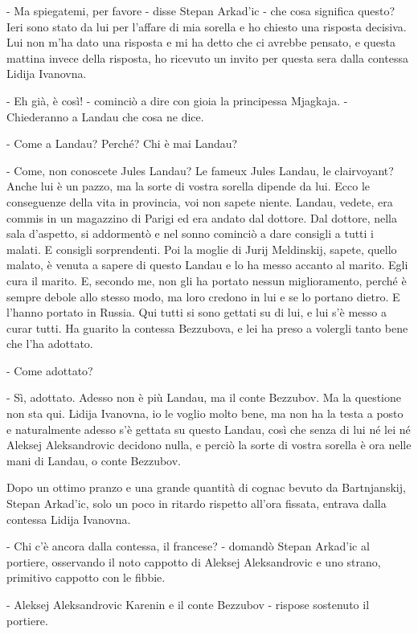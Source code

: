 - Ma spiegatemi, per favore - disse Stepan Arkad'ic - che cosa significa questo? Ieri sono stato da lui per l'affare di mia sorella e ho chiesto una risposta decisiva. Lui non m'ha dato una risposta e mi ha detto che ci avrebbe pensato, e questa mattina invece della risposta, ho ricevuto un invito per questa sera dalla contessa Lidija Ivanovna. 

- Eh già, è così! - cominciò a dire con gioia la principessa Mjagkaja. - Chiederanno a Landau che cosa ne dice. 

- Come a Landau? Perché? Chi è mai Landau? 

- Come, non conoscete Jules Landau? Le fameux Jules Landau, le clairvoyant? Anche lui è un pazzo, ma la sorte di vostra sorella dipende da lui. Ecco le conseguenze della vita in provincia, voi non sapete niente. Landau, vedete, era commis in un magazzino di Parigi ed era andato dal dottore. Dal dottore, nella sala d'aspetto, si addormentò e nel sonno cominciò a dare consigli a tutti i malati. E consigli sorprendenti. Poi la moglie di Jurij Meldinskij, sapete, quello malato, è venuta a sapere di questo Landau e lo ha messo accanto al marito. Egli cura il marito. E, secondo me, non gli ha portato nessun miglioramento, perché è sempre debole allo stesso modo, ma loro credono in lui e se lo portano dietro. E l'hanno portato in Russia. Qui tutti si sono gettati su di lui, e lui s'è messo a curar tutti. Ha guarito la contessa Bezzubova, e lei ha preso a volergli tanto bene che l'ha adottato. 

- Come adottato? 

- Sì, adottato. Adesso non è più Landau, ma il conte Bezzubov. Ma la questione non sta qui. Lidija Ivanovna, io le voglio molto bene, ma non ha la testa a posto e naturalmente adesso s'è gettata su questo Landau, così che senza di lui né lei né Aleksej Aleksandrovic decidono nulla, e perciò la sorte di vostra sorella è ora nelle mani di Landau, o conte Bezzubov. 

Dopo un ottimo pranzo e una grande quantità di cognac bevuto da Bartnjanskij, Stepan Arkad'ic, solo un poco in ritardo rispetto all'ora fissata, entrava dalla contessa Lidija Ivanovna. 

- Chi c'è ancora dalla contessa, il francese? - domandò Stepan Arkad'ic al portiere, osservando il noto cappotto di Aleksej Aleksandrovic e uno strano, primitivo cappotto con le fibbie. 

- Aleksej Aleksandrovic Karenin e il conte Bezzubov - rispose sostenuto il portiere. 

